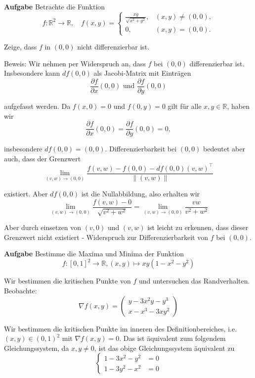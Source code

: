 \hrulefill

\textbf{Aufgabe} Betrachte die Funktion
$$
f: \mathbb{R}^{2} \rightarrow \mathbb{R}, \quad f(x, y)= \begin{cases}\frac{x y}{\sqrt{x^{2}+y^{2}}}, & (x, y) \neq(0,0), \\ 0, & (x, y)=(0,0) .\end{cases}
$$

Zeige, dass $f$ in $(0,0)$ nicht differenzierbar ist.

Beweis: Wir nehmen per Widerspruch an, dass $f$ bei $(0,0)$ differenzierbar ist. Insbesondere kann $d f(0,0)$ als Jacobi-Matrix mit Einträgen
$$
\frac{\partial f}{\partial x}(0,0) \text { und } \frac{\partial f}{\partial y}(0,0)
$$

aufgefasst werden. Da $f(x, 0)=0$ und $f(0, y)=0$ gilt für alle $x, y \in \mathbb{R}$, haben wir
$$
\frac{\partial f}{\partial x}(0,0)=\frac{\partial f}{\partial y}(0,0)=0,
$$

insbesondere $d f(0,0)=(0,0)$. Differenzierbarkeit bei $(0,0)$ bedeutet aber auch, dass der 
Grenzwert
$$
\lim _{(v, w) \rightarrow(0,0)} \frac{f(v, w)-f(0,0)-d f(0,0)(v, w)^\top}{\|(v, w)\|}
$$

existiert. Aber $d f(0,0)$ ist die Nullabbildung, also erhalten wir
$$
\lim _{(v, w) \rightarrow(0,0)} \frac{f(v, w)-0}{\sqrt{v^{2}+w^{2}}}=\lim _{(v, w) \rightarrow(0,0)} \frac{v w}{v^{2}+w^{2}}
$$

Aber durch einsetzen von $(v, 0)$ und $(v, w)$ ist leicht zu erkennen, dass dieser Grenzwert nicht existiert - Widerspruch zur Differenzierbarkeit von $f$ bei $(0,0)$. \medskip

\hrulefill

\textbf{Aufgabe} Bestimme die Maxima und Minima der Funktion
$$f:[0,1]^{2} \rightarrow \mathbb{R},(x, y) \mapsto x y\left(1-x^{2}-y^{2}\right)$$

Wir bestimmen die kritischen Punkte von $f$ und untersuchen das Randverhalten. Beobachte:
$$
\nabla f(x, y)=\left(\begin{array}{l}
y-3 x^{2} y-y^{3} \\
x-x^{3}-3 x y^{2}
\end{array}\right)
$$

Wir bestimmen die kritischen Punkte im inneren des Definitionbereiches, i.e. $(x, y) \in(0,1)^{2}$
mit $\nabla f(x, y)=0$. Das ist äquivalent zum folgendem Gleichungssystem, da $x, y \neq 0$, 
ist das obige Gleichungssystem äquivalent zu 
$$\begin{cases}1-3 x^{2}-y^{2} & =0 \\ 1-3 y^{2}-x^{2} & =0\end{cases}$$

